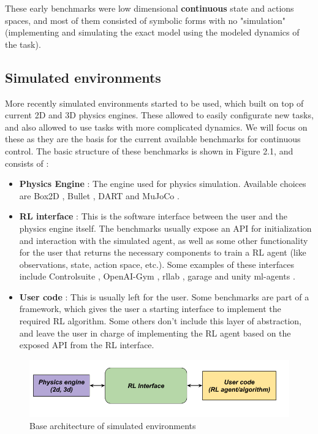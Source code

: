     These early benchmarks were low dimensional \textbf{continuous} state and actions spaces, 
    and most of them consisted of symbolic forms with no "simulation" (implementing and simulating
    the exact model using the modeled dynamics of the task). 

    \subsection{Simulated environments}
    
    More recently simulated environments started to be used, which built on top of current 2D and 3D
    physics engines. These allowed to easily configurate new tasks, and also allowed to use tasks 
    with more complicated dynamics. We will focus on these as they are the basis for the current
    available benchmarks for continuous control. The basic structure of these benchmarks is shown in Figure 2.1, and consists of :

    \begin{itemize}
        \item \textbf{Physics Engine} : The engine used for physics simulation. Available choices are Box2D \citep{Box2D},
                Bullet \citep{Bullet}, DART \citep{DART} and MuJoCo \citep{MuJoCo}.
        \item \textbf{RL interface} : This is the software interface between the user and the physics engine itself. The 
                benchmarks usually expose an API for initialization and interaction with the simulated agent, as well as 
                some other functionality for the user that returns the necessary components to train a RL agent (like observations,
                state, action space, etc.). Some examples of these interfaces include Controlsuite \citep{Controlsuite}, 
                OpenAI-Gym \citep{OpenAIgym}, rllab \citep{rllab}, garage \citep{garage} and unity ml-agents \citep{unity-ml-agents}.
        \item \textbf{User code} : This is usually left for the user. Some benchmarks are part of a framework, which gives the user
                a starting interface to implement the required RL algorithm. Some others don't include this layer of abstraction, and
                leave the user in charge of implementing the RL agent based on the exposed API from the RL interface.
    \end{itemize}

    \begin{figure}[!ht]
	\centering
	\includegraphics[width=4.5in]{./chapters/imgs/img_base_sim_env.png}
	\caption[Basic structure of a simulated environment]{Base architecture of simulated environments}
	\label{fig:sim-env}
    \end{figure}

